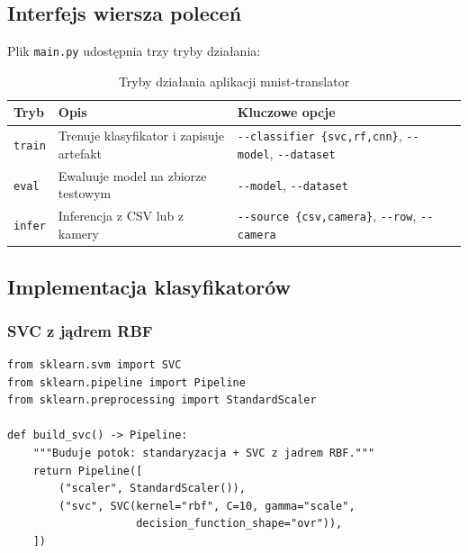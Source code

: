 \subsection{Interfejs wiersza poleceń}

Plik \texttt{main.py} udostępnia trzy tryby działania:

\begin{table}[H]
    \centering
    \caption{Tryby działania aplikacji mnist-translator}
    \label{tab:tryby}
    \begin{tabularx}{\textwidth}{llX}
        \toprule
        \textbf{Tryb} & \textbf{Opis} & \textbf{Kluczowe opcje} \\
        \midrule
        \texttt{train}  & Trenuje klasyfikator i zapisuje artefakt
                        & \texttt{-{}-classifier \{svc,rf,cnn\}}, \texttt{-{}-model}, \texttt{-{}-dataset} \\
        \texttt{eval}   & Ewaluuje model na zbiorze testowym
                        & \texttt{-{}-model}, \texttt{-{}-dataset} \\
        \texttt{infer}  & Inferencja z CSV lub z kamery
                        & \texttt{-{}-source \{csv,camera\}}, \texttt{-{}-row}, \texttt{-{}-camera} \\
        \bottomrule
    \end{tabularx}
\end{table}

\subsection{Implementacja klasyfikatorów}

\subsubsection{SVC z jądrem RBF}

\begin{lstlisting}[style=stylePython, caption={Budowa potoku SVC (src/model/classifiers/svc.py)}, label=lst:svc]
from sklearn.svm import SVC
from sklearn.pipeline import Pipeline
from sklearn.preprocessing import StandardScaler

def build_svc() -> Pipeline:
    """Buduje potok: standaryzacja + SVC z jadrem RBF."""
    return Pipeline([
        ("scaler", StandardScaler()),
        ("svc", SVC(kernel="rbf", C=10, gamma="scale",
                    decision_function_shape="ovr")),
    ])
\end{lstlisting}


